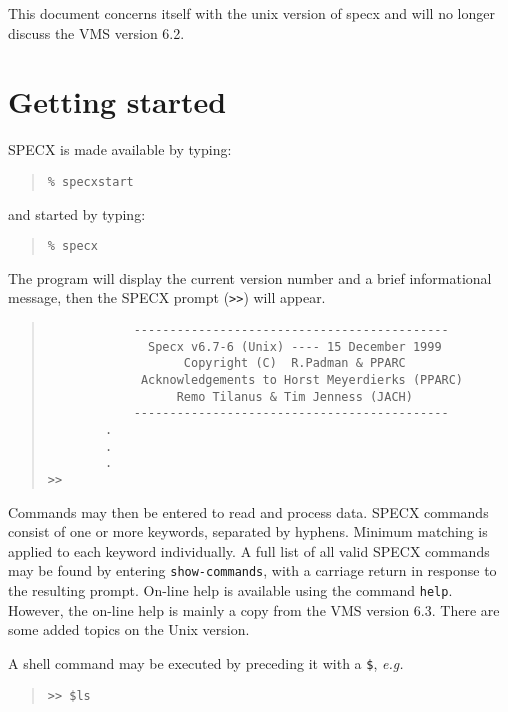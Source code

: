 \documentclass[twoside,11pt]{article}
\renewcommand{\_}{\texttt{\symbol{95}}}
\newenvironment{myquote}{\begin{quote}\begin{small}}{\end{small}\end{quote}}
\begin{document}
This document concerns itself with the unix version of specx and will
no longer discuss the VMS version 6.2.

\section {Getting started}

SPECX is made available by typing:
\begin{myquote}
\begin{verbatim}
% specxstart
\end{verbatim}
\end{myquote}
and started by typing:
\begin{myquote}
\begin{verbatim}
% specx 
\end{verbatim}
\end{myquote}
The program will display the current version number and
a brief informational message, then the SPECX prompt ({\tt>>}) will appear.

\begin{myquote}
\begin{verbatim}
            --------------------------------------------
              Specx v6.7-6 (Unix) ---- 15 December 1999
                   Copyright (C)  R.Padman & PPARC
             Acknowledgements to Horst Meyerdierks (PPARC)
                  Remo Tilanus & Tim Jenness (JACH)
            --------------------------------------------
        .
        .
        .
>> 
\end{verbatim}
\end{myquote}

Commands may then be entered to read and process data.
SPECX commands consist of one or more keywords, separated
by hyphens. Minimum matching is applied to each keyword
individually. A full list of all valid SPECX commands
may be found by entering {\tt show-commands}, with a carriage return
in response to the resulting prompt. On-line help is available
using the command {\tt help}. However, the on-line help is mainly a copy
from the VMS version 6.3. There are some added topics on the Unix version.

A shell command may be executed by preceding it with a {\tt \$}, {\em e.g.}

\begin{myquote}
\begin{verbatim}
>> $ls
\end{verbatim}
\end{myquote}
\end{document}
